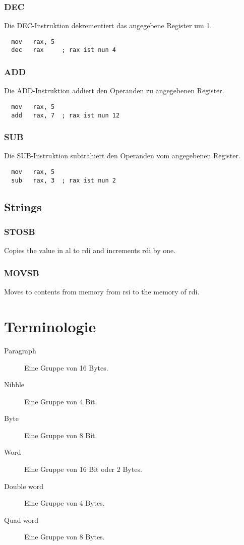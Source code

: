 \documentclass[12pt, a4paper, oneside]{article}
\begin{document}
\subsubsection{DEC}
Die DEC-Instruktion dekrementiert das angegebene Register um 1.
\begin{verbatim}
  mov   rax, 5
  dec   rax     ; rax ist nun 4
\end{verbatim} 

\subsubsection{ADD}
Die ADD-Instruktion addiert den Operanden zu angegebenen Register.
\begin{verbatim}
  mov   rax, 5
  add   rax, 7  ; rax ist nun 12
\end{verbatim} 

\subsubsection{SUB}
Die SUB-Instruktion subtrahiert den Operanden vom angegebenen Register.
\begin{verbatim}
  mov   rax, 5
  sub   rax, 3  ; rax ist nun 2
\end{verbatim} 

\subsection{Strings}
\subsubsection{STOSB}
Copies the value in al to rdi and increments rdi by one.

\subsubsection{MOVSB}
Moves to contents from memory from rsi to the memory of rdi.


\newpage
\section{Terminologie}
\begin{description}
  \item[Paragraph] Eine Gruppe von 16 Bytes.
  \item[Nibble] Eine Gruppe von 4 Bit.
  \item[Byte] Eine Gruppe von 8 Bit.
  \item[Word] Eine Gruppe von 16 Bit oder 2 Bytes.
  \item[Double word] Eine Gruppe von 4 Bytes.
  \item[Quad word] Eine Gruppe von 8 Bytes.
\end{description}
\end{document}
